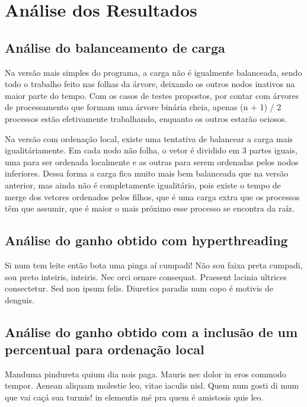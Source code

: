 \section{Análise dos Resultados}

\subsection{Análise do balanceamento de carga}

Na versão mais simples do programa, a carga não é igualmente balanceada, sendo todo o trabalho feito nas folhas da árvore, deixando os outros nodos inativos na maior parte do tempo. Com os casos de testes propostos, por contar com árvores de processamento que formam uma árvore binária cheia, apenas (n + 1) / 2 processos estão efetivamente trabalhando, enquanto os outros estarão ociosos.

Na versão com ordenação local, existe uma tentativa de balancear a carga mais igualitáriamente. Em cada nodo não folha, o vetor é dividido em 3 partes iguais, uma para ser ordenada localmente e as outras para serem ordenadas pelos nodos inferiores. Dessa forma a carga fica muito mais bem balanceada que na versão anterior, mas ainda não é completamente igualitário, pois existe o tempo de merge dos vetores ordenados pelos filhos, que é uma carga extra que os processos têm que assumir, que é maior o mais próximo esse processo se encontra da raíz.

\subsection{Análise do ganho obtido com hyperthreading}
Si num tem leite então bota uma pinga aí cumpadi! Não sou faixa preta cumpadi, sou preto inteiris, inteiris. Nec orci ornare consequat. Praesent lacinia ultrices consectetur. Sed non ipsum felis. Diuretics paradis num copo é motivis de denguis.

\subsection{Análise do ganho obtido com a inclusão de um percentual para ordenação local}

Manduma pindureta quium dia nois paga. Mauris nec dolor in eros commodo tempor. Aenean aliquam molestie leo, vitae iaculis nisl. Quem num gosti di mum que vai caçá sua turmis! in elementis mé pra quem é amistosis quis leo.
